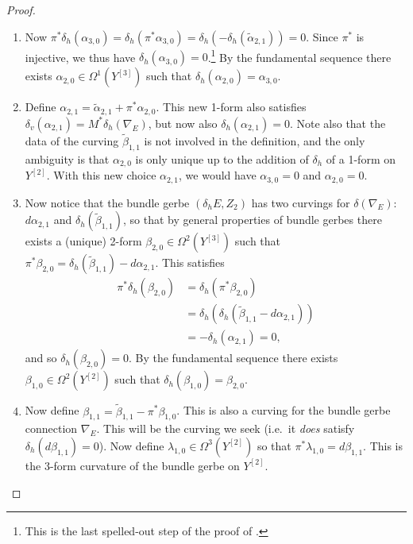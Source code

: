 \documentclass[12pt]{amsart}
\theoremstyle{plain}
\theoremstyle{definition}
\theoremstyle{remark}
\numberwithin{equation}{section}
\newcommand{\<}{\langle}
\renewcommand{\>}{\rangle}
\begin{document}
\begin{proof}
\begin{enumerate}
\item Now $\pi^*\delta_h(\alpha_{3,0}) = \delta_h(\pi^*\alpha_{3,0}) = \delta_h(-\delta_h(\tilde\alpha_{2,1})) = 0$. Since $\pi^*$ is injective, we thus have $\delta_h(\alpha_{3,0}) = 0$.\footnote{This is the last spelled-out step of the proof of \cite[Proposition 10.1]{StevPhD}.} By the fundamental sequence there exists $\alpha_{2,0}\in \Omega^1(Y^{[3]})$ such that $\delta_h(\alpha_{2,0}) = \alpha_{3,0}$. 


\item Define $\alpha_{2,1} = \tilde\alpha_{2,1} + \pi^*\alpha_{2,0}$. 
This new 1-form also satisfies $\delta_v(\alpha_{2,1}) = M^*\delta_h(\nabla_E)$, but now also $\delta_h(\alpha_{2,1}) = 0$.
Note also that the data of the curving $\widetilde\beta_{1,1}$ is not involved in the definition, and the only ambiguity is that $\alpha_{2,0}$ is only unique up to the addition of $\delta_h$ of a 1-form on $Y^{[2]}$.
With this new choice $\alpha_{2,1}$, we would have $\alpha_{3,0}=0$ and $\alpha_{2,0}=0$.

\item Now notice that the bundle gerbe $(\delta_hE,Z_2)$ has two curvings for $\delta(\nabla_E)$: $d\alpha_{2,1}$ and $\delta_h(\widetilde\beta_{1,1})$, so that by general properties of bundle gerbes there exists a (unique) 2-form $\beta_{2,0}\in \Omega^2(Y^{[3]})$ such that $\pi^*\beta_{2,0} = \delta_h(\widetilde\beta_{1,1}) - d\alpha_{2,1}$. This satisfies
\begin{align*}
\pi^*\delta_h(\beta_{2,0}) & =\delta_h(\pi^*\beta_{2,0}) \\
& = \delta_h(\delta_h(\widetilde\beta_{1,1} - d\alpha_{2,1}))\\
&= -\delta_h(\alpha_{2,1}) = 0,
\end{align*}
and so $\delta_h(\beta_{2,0})=0$.
By the fundamental sequence there exists $\beta_{1,0}\in \Omega^2(Y^{[2]})$ such that $\delta_h(\beta_{1,0}) = \beta_{2,0}$.

\item Now define $\beta_{1,1} = \widetilde\beta_{1,1} - \pi^*\beta_{1,0}$. This is also a curving for the bundle gerbe connection $\nabla_E$. This will be the curving we seek (i.e.\ it \emph{does} satisfy $\delta_h(d{\beta_{1,1}}) = 0$).
Now define $\lambda_{1,0}\in \Omega^3(Y^{[2]})$ so that $\pi^*\lambda_{1,0} = d\beta_{1,1}$.
This is the 3-form curvature of the bundle gerbe on $Y^{[2]}$.



\end{enumerate}
\end{proof}
\end{document}
